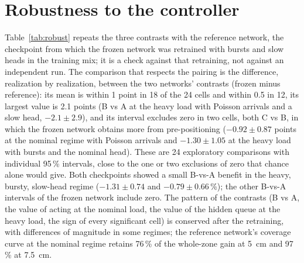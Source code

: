 \documentclass[11pt,a4paper]{article}
\begin{document}

\section{Robustness to the controller}\label{sup:robust}
Table~\ref{tab:robust} repeats the three contrasts with the reference network, the
checkpoint from which the frozen network was retrained with bursts and slow heads in the
training mix; it is a check against that retraining, not against an independent run.
The comparison that respects the pairing is the difference, realization by realization,
between the two networks' contrasts (frozen minus reference): its mean is within 1 point
in 18 of the 24 cells and within 0.5 in 12, its largest value is 2.1 points (B vs A at
the heavy load with Poisson arrivals and a slow head, $-2.1\pm2.9$), and its interval
excludes zero in two cells, both C vs B, in which the frozen network obtains more from
pre-positioning ($-0.92\pm0.87$ points at the nominal regime with Poisson arrivals and
$-1.30\pm1.05$ at the heavy load with bursts and the nominal head). These are 24
exploratory comparisons with individual 95\,\% intervals, close to the one or two
exclusions of zero that chance alone would give. Both checkpoints showed a small B-vs-A
benefit in the heavy, bursty, slow-head regime ($-1.31\pm0.74$ and $-0.79\pm0.66$\,\%);
the other B-vs-A intervals of the frozen network include zero. The pattern of the
contrasts (B vs A, the value of acting at the nominal load, the value of the hidden queue at the
heavy load, the sign of every significant cell) is conserved after the retraining, with
differences of magnitude in some regimes; the reference network's coverage curve at the
nominal regime retains 76\,\% of the whole-zone gain at 5~cm and 97\,\% at 7.5~cm.

\begin{table}[t]
\centering\small
\caption{Reference cell, robustness (a secondary analysis of the phase-4 data, added after the run): the reference network's contrasts (as
main-paper Table~\ref{M-tab:contrasts}) and the paired difference between the frozen and the
reference network's contrasts (frozen minus reference, per realization, points; negative
= the frozen network obtains more from the treatment). Bold: the interval excludes zero. Seeds 7000--7029, shared with the companion paper.}
\label{tab:robust}
\resizebox{\linewidth}{!}{}
\end{table}
\end{document}
